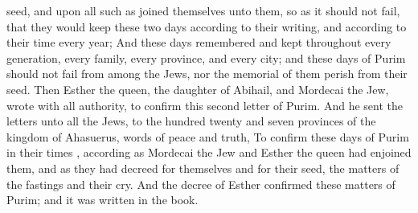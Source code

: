 {seed, and upon all such as
joined themselves unto them, so as it should not
fail, that they would
keep these
two
days according to their
writing, and according to their
{}
time every
year;
And
{} these
days
{}
remembered and
kept
throughout every
generation, every
family, every
province, and every
city; and
{} these
days of
Purim should not
fail from
among the
Jews, nor the
memorial of them
perish from their
seed.
Then
Esther the
queen, the
daughter of
Abihail, and
Mordecai the
Jew,
wrote with all
authority, to
confirm this
second
letter of
Purim.
And he
sent the
letters unto all the
Jews, to the
hundred
twenty and
seven
provinces of the
kingdom of
Ahasuerus,
{}
words of
peace and
truth,
To
confirm these
days of
Purim in their
times
{}, according as
Mordecai the
Jew and
Esther the
queen had
enjoined them, and as they had
decreed for
themselves and for their
seed, the
matters of the
fastings and their
cry.
And the
decree of
Esther
confirmed these
matters of
Purim; and it was
written in the
book.

\par }